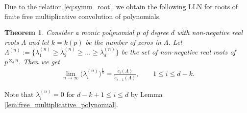\documentclass[pdftex]{sigma}
\newtheorem{Theorem}{Theorem}[section]
\numberwithin{equation}{section}
\begin{document}
Due to the relation \eqref{eq:symm_root}, we obtain the following LLN for roots of finite free multiplicative convolution of polynomials.

\begin{Theorem}\label{thm:LLN}
Consider a monic polynomial $p$ of degree $d$ with non-negative real roots $\Lambda$ and let $k=k(p)$ be the number of zeros in $\Lambda$.
Let $\Lambda^{(n)}:=\big\{\lambda_{1}^{(n)} \ge \lambda_{2}^{(n)} \ge\dots \ge \lambda_{d}^{(n)} \big\} $ be the set of non-negative real roots of $p^{\boxtimes_d n}$.
Then we get
\begin{align*}
\lim_{n\rightarrow\infty}\big(\lambda_{i}^{(n)}\big)^{\frac{1}{n}} =\frac{\widetilde{e}_i(\Lambda)}{\widetilde{e}_{i-1}(\Lambda)}, \qquad 1 \le i \le d-k.
\end{align*}
\end{Theorem}

\begin{Remark}
Note that $\lambda_{i}^{(n)} = 0$ for $d-k+1 \le i \le d$ by Lemma \ref{lem:free_multiplicative_polynomial}.
\end{Remark}
\end{document}
